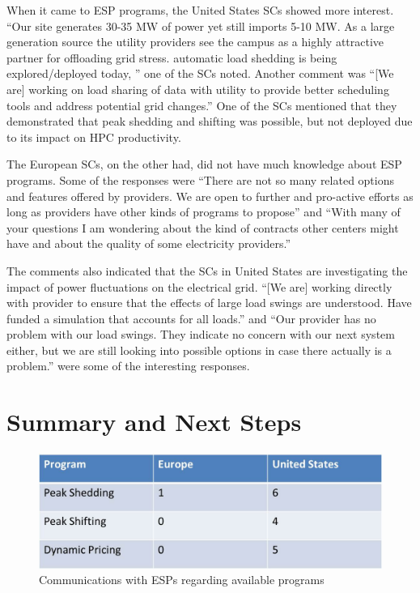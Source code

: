 \documentclass{article}
\begin{document}
When it came to ESP programs, the United States SCs showed more interest. ``Our site generates 30-35 MW of power yet still imports 5-10 MW. As a large generation source the utility providers see the campus as a highly attractive partner for offloading grid stress. automatic load shedding is being explored/deployed today, '' one of the SCs noted. Another comment was ``[We are] working on load sharing of data with utility to provide better scheduling tools and address potential grid changes.'' One of the SCs mentioned that they demonstrated that peak shedding and shifting was possible, but not deployed due to its impact on HPC productivity. 

The European SCs, on the other had, did not have much knowledge about ESP programs. Some of the responses were ``There are not so many related options and features offered by providers. We are open to further and pro-active efforts as long as providers have other kinds of programs to propose'' and ``With many of your questions I am wondering about the kind of contracts other centers might have and about the quality of some electricity providers.''

The comments also indicated that the SCs in United States are investigating the impact of power fluctuations on the electrical grid. ``[We are] working directly with provider to ensure that the effects of large load swings are understood. Have funded a simulation that accounts for all loads.'' and ``Our provider has no problem with our load swings. They indicate no concern with our next system either, but we are still looking into possible options in case there actually is a problem.'' were some of the interesting responses.

\section{Summary and Next Steps}
\label{summary}

\begin{figure}
\begin{center}
\includegraphics[scale=0.5]{figs/Table3.jpg}
\caption{Communications with ESPs regarding available programs}
\label{fig:table3}
\end{center}
\end{figure}
\end{document}
